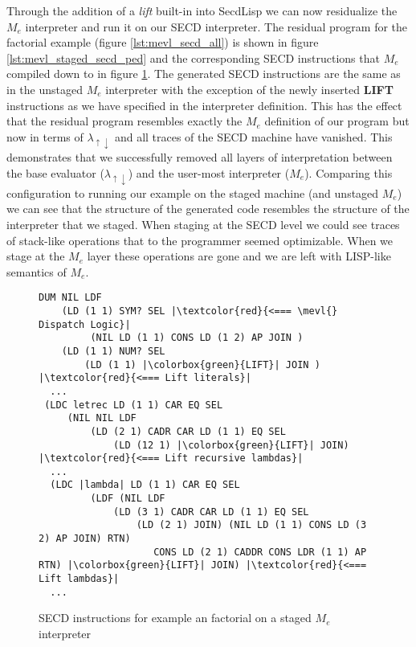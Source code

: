 \documentclass[a4paper,12pt,twoside,openright]{report}
\theoremstyle{definition}
\newcommand{\mslang}{$\lambda_{\uparrow\downarrow}$}
\newcommand{\mevl}{$M_{e}$}
\newcommand{\secdlisp}{SecdLisp}
\begin{document}
Through the addition of a \textit{lift} built-in into \secdlisp{} we can now residualize the \mevl{} interpreter and run it on our SECD interpreter. The residual program for the factorial example (figure \ref{lst:mevl_secd_all}) is shown in figure \ref{lst:mevl_staged_secd_ped} and the corresponding SECD instructions that \mevl{} compiled down to in figure \ref{lst:mevl_staged_secd_ops}. The generated SECD instructions are the same as in the unstaged \mevl{} interpreter with the exception of the newly inserted \textbf{LIFT} instructions as we have specified in the interpreter definition. This has the effect that the residual program resembles exactly the \mevl{} definition of our program but now in terms of \mslang{} and all traces of the SECD machine have vanished. This demonstrates that we successfully removed all layers of interpretation between the base evaluator (\mslang{}) and the user-most interpreter (\mevl{}). Comparing this configuration to running our example on the staged machine (and unstaged \mevl{}) we can see that the structure of the generated code resembles the structure of the interpreter that we staged. When staging at the SECD level we could see traces of stack-like operations that to the programmer seemed optimizable. When we stage at the \mevl{} layer these operations are gone and we are left with LISP-like semantics of \mevl{}.

\begin{figure}[htp!]
\centering
         \begin{verbatim}
DUM NIL LDF
    (LD (1 1) SYM? SEL |\textcolor{red}{<=== \mevl{} Dispatch Logic}|
         (NIL LD (1 1) CONS LD (1 2) AP JOIN )
    (LD (1 1) NUM? SEL
        (LD (1 1) |\colorbox{green}{LIFT}| JOIN ) |\textcolor{red}{<=== Lift literals}|
  ...
 (LDC letrec LD (1 1) CAR EQ SEL
     (NIL NIL LDF
         (LD (2 1) CADR CAR LD (1 1) EQ SEL
             (LD (12 1) |\colorbox{green}{LIFT}| JOIN) |\textcolor{red}{<=== Lift recursive lambdas}|
  ...
  (LDC |lambda| LD (1 1) CAR EQ SEL
         (LDF (NIL LDF
             (LD (3 1) CADR CAR LD (1 1) EQ SEL
                 (LD (2 1) JOIN) (NIL LD (1 1) CONS LD (3 2) AP JOIN) RTN)
                    CONS LD (2 1) CADDR CONS LDR (1 1) AP RTN) |\colorbox{green}{LIFT}| JOIN) |\textcolor{red}{<=== Lift lambdas}|
  ...
         \end{verbatim}
\caption{SECD instructions for example an factorial on a staged \mevl{} interpreter}
\label{lst:mevl_staged_secd_ops}
\end{figure}
\end{document}
